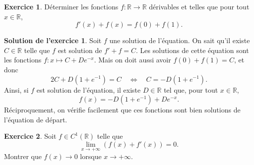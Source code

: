 \documentclass[a4paper, 11pt,openany]{article}%
\theoremstyle{plain}
\theoremstyle{definition}
\newtheorem{exo}{Exercice}
\newtheorem{sol}{Solution de l'exercice}
\theoremstyle{remark}
\newcommand{\R}{\mathbb{R}}
\begin{document}
\begin{exo}
Déterminer les fonctions $f:\R \to \R$ dérivables et telles que pour tout $x \in \R$, 
\[ f'(x)+f(x)=f(0)+f(1).\]
\end{exo}

\begin{sol}
Soit $f$ une solution de l'équation. On sait qu'il existe $C \in \R$ telle que $f$ est solution de $f'+f=C$. Les solutions de cette équation sont les fonctions $f:x \mapsto C+De^{-x}$. Mais on doit aussi avoir $f(0)+f(1)=C$, et donc \[ 2C+D(1+e^{-1})=C \quad \Leftrightarrow \quad C=-D(1+e^{-1}).\]
Ainsi, si $f$ est solution de l'équation, il existe $D \in \R$ tel que, pour tout $x \in \R$, 
\[ f(x)=-D(1+e^{-1})+De^{-x}.\] Réciproquement, on vérifie facilement que ces fonctions sont bien solutions de l'équation de départ. 
\end{sol}
   




\begin{exo}
Soit $f \in C^1(\R)$ telle que \[ \lim_{x \to + \infty} (f(x)+f'(x))=0.\]
Montrer que $f(x) \to 0$ lorsque $x \to + \infty$.
\end{exo}
\end{document}
